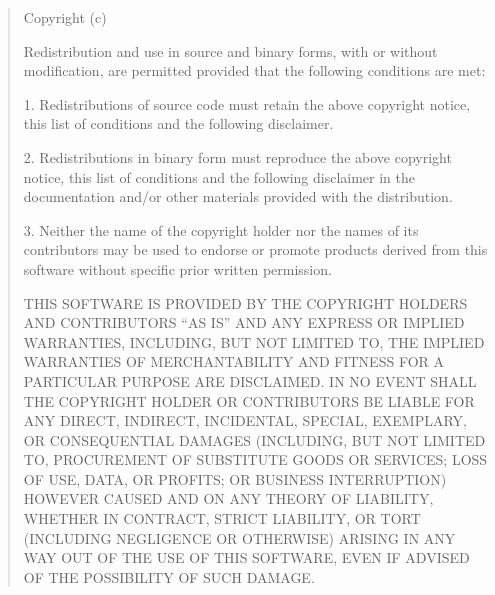 \expandafter\def\csname qdissertation@licensetext@BSD-3-Clause\endcsname{%
  \begin{quote}\small\raggedright
    Copyright (c) \ifstrempty{\qdissertation@licenseyear}{\number\year}{\qdissertation@licenseyear}\ %
    \ifstrempty{\qdissertation@copyrightholder}{\qdissertation@author}{\qdissertation@copyrightholder}

    Redistribution and use in source and binary forms, with or without modification, are permitted provided that the following conditions are met:

    1. Redistributions of source code must retain the above copyright notice, this list of conditions and the following disclaimer.

    2. Redistributions in binary form must reproduce the above copyright notice, this list of conditions and the following disclaimer in the documentation and/or other materials provided with the distribution.

    3. Neither the name of the copyright holder nor the names of its contributors may be used to endorse or promote products derived from this software without specific prior written permission.

    THIS SOFTWARE IS PROVIDED BY THE COPYRIGHT HOLDERS AND CONTRIBUTORS ``AS IS'' AND ANY EXPRESS OR IMPLIED WARRANTIES, INCLUDING, BUT NOT LIMITED TO, THE IMPLIED WARRANTIES OF MERCHANTABILITY AND FITNESS FOR A PARTICULAR PURPOSE ARE DISCLAIMED. IN NO EVENT SHALL THE COPYRIGHT HOLDER OR CONTRIBUTORS BE LIABLE FOR ANY DIRECT, INDIRECT, INCIDENTAL, SPECIAL, EXEMPLARY, OR CONSEQUENTIAL DAMAGES (INCLUDING, BUT NOT LIMITED TO, PROCUREMENT OF SUBSTITUTE GOODS OR SERVICES; LOSS OF USE, DATA, OR PROFITS; OR BUSINESS INTERRUPTION) HOWEVER CAUSED AND ON ANY THEORY OF LIABILITY, WHETHER IN CONTRACT, STRICT LIABILITY, OR TORT (INCLUDING NEGLIGENCE OR OTHERWISE) ARISING IN ANY WAY OUT OF THE USE OF THIS SOFTWARE, EVEN IF ADVISED OF THE POSSIBILITY OF SUCH DAMAGE.
  \end{quote}%
}

